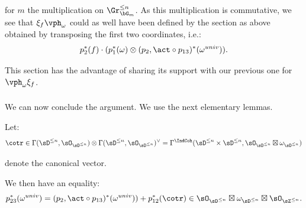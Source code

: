  for $m$ the multiplication on $\Gr_{\bG_m}^{\leq n}$.
As this multiplication is commutative, we see that
$\xi_f\vph_{\omega}$ could as well have been defined
by the section as above obtained by transposing
the first two coordinates, i.e.:
%
\[
\begin{gathered}
p_2^*(f) \cdot
(p_1^*(\omega) \otimes (p_2,\act \circ p_{13})^*(\omega^{univ})).
\end{gathered}
\]

 This section has the advantage of
sharing its support with our previous one for
$\vph_{\omega}\xi_f$.

\subsubsection{}

We can now conclude the argument. We use the next elementary lemmas.

\begin{lem}
\notready\label{l:cotr-1}

Let:
%
\[
\cotr \in
\Gamma(\sD^{\leq n},\sO_{\sD^{\leq n}}) \otimes
\Gamma(\sD^{\leq n},\sO_{\sD^{\leq n}})^{\vee} =
\Gamma^{\IndCoh}(\sD^{\leq n} \times \sD^{\leq n},
\sO_{\sD^{\leq n}} \boxtimes \omega_{\sD^{\leq n}})
\]

 denote the canonical vector.

We then have an equality:
%
\[
p_{23}^*(\omega^{univ}) =
(p_2,\act \circ p_{13})^*(\omega^{univ}))
+p_{12}^*(\cotr)
\in
\sO_{\sD^{\leq n}} \boxtimes
\omega_{\sD^{\leq n}} \boxtimes \sO_{\sZ^{\leq n}}.
\]

\end{lem}

